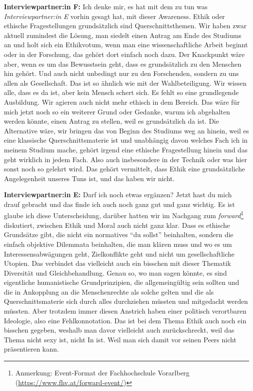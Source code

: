 \documentclass[a4paper,12pt,twoside,numbers=noendperiod]{scrreprt}
\begin{document}
\textbf{Interviewpartner:in F:} Ich denke mir, es hat mit dem zu tun was \textit{Interviewpartner:in E} vorhin gesagt hat, mit dieser Awareness. Ethik oder ethische Fragestellungen grundsätzlich sind Querschnittsthemen. Wir haben zwar aktuell zumindest die Lösung, man siedelt einen Antrag am Ende des Studiums an und holt sich ein Ethikvotum, wenn man eine wissenschaftliche Arbeit beginnt oder in der Forschung, das gehört dort einfach noch dazu. Der Knackpunkt wäre aber, wenn es um das Bewusstsein geht, dass es grundsätzlich zu den Menschen hin gehört. Und auch nicht unbedingt nur zu den Forschenden, sondern zu uns allen als Gesellschaft. Das ist so ähnlich wie mit der Wahlbeteiligung. Wir wissen alle, dass es da ist, aber kein Mensch schert sich. Es fehlt so eine grundlegende Ausbildung. Wir agieren auch nicht mehr ethisch in dem Bereich. Das wäre für mich jetzt noch so ein weiterer Grund oder Gedanke, warum ich abgehalten werden könnte, einen Antrag zu stellen, weil es grundsätzlich da ist. Die Alternative wäre, wir bringen das von Beginn des Studiums weg an hinein, weil es eine klassische Querschnittsmaterie ist und unabhängig davon welches Fach ich in meinem Studium mache, gehört irgend eine ethische Fragestellung hinein und das geht wirklich in jedem Fach. Also auch insbesondere in der Technik oder was hier sonst noch so gelehrt wird. Das gehört vermittelt, dass Ethik eine grundsätzliche Angelegenheit unseres Tuns ist, und das haben wir nicht.

\textbf{Interviewpartner:in E:} Darf ich noch etwas ergänzen? Jetzt hast du mich drauf gebracht und das finde ich auch noch ganz gut und ganz wichtig. Es ist glaube ich diese Unterscheidung, darüber hatten wir im Nachgang zum \textit{forward}\footnote{Anmerkung: Event-Format der Fachhochschule Vorarlberg (\url{https://www.fhv.at/forward-event/})} diskutiert, zwischen Ethik und Moral auch nicht ganz klar. Dass es ethische Grundsätze gibt, die nicht ein normatives \enquote{du sollst} beinhalten, sondern die einfach objektive Dilemmata beinhalten, die man klären muss und wo es um Interessensabwägungen geht, Zielkonflikte geht und nicht um gesellschaftliche Utopien. Das verbindet das vielleicht auch ein bisschen mit dieser Thematik Diversität und Gleichbehandlung. Genau so, wo man sagen könnte, es sind eigentliche humanistische Grundprinzipien, die allgemeingültig sein sollten und die in Ankopplung an die Menschenrechte als solche gelten und die als Querschnittsmaterie sich durch alles durchziehen müssten und mitgedacht werden müssten. Aber trotzdem immer diesen Anstrich haben einer politisch verortbaren Ideologie, also eine Fehlkonnotation. Das ist bei dem Thema Ethik auch noch ein bisschen gegeben, weshalb man davor vielleicht auch zurückschreckt, weil das Thema nicht sexy ist, nicht In ist. Weil man sich damit vor seinen Peers nicht präsentieren kann.
\end{document}
